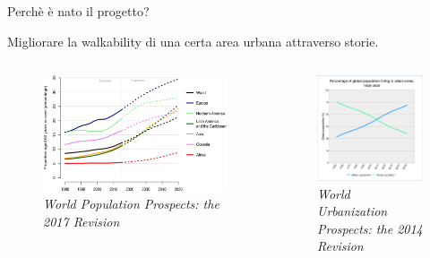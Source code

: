 \documentclass[11pt,aspectratio=169]{beamer}
\begin{document}
\begin{frame}{Perchè è nato il progetto?}
\begin{center}
    Migliorare la walkability di una certa area urbana attraverso storie.
\end{center}
\begin{columns}[onlytextwidth]
\begin{column}{.45\textwidth}
\begin{figure}
  \includegraphics[scale=0.45]{Tesi/images/invecchiamento-popolazione.png}
    \captionsetup{labelformat=empty}
    \caption{\tiny{\textit{World Population Prospects: the 2017 Revision}}}
\end{figure}
\end{column}
\hfill
\begin{column}{.45\textwidth}
\begin{figure}
  \includegraphics[scale=0.5]{Tesi/images/urbanizzazione.png}
    \captionsetup{labelformat=empty}
    \caption{\tiny{\textit{World Urbanization Prospects: the 2014 Revision}}}\hfill
\end{figure}
\end{column}
\end{columns}
\end{frame}
\end{document}
